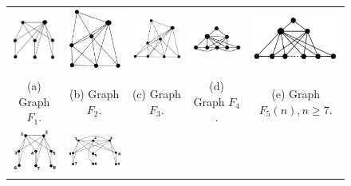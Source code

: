  \begin{figure}[htb]	
 
   \centering
  \begin{tabular}{  c c c c  c}
    \includegraphics[width=2.5cm]{img/f1.png} 
    & 
    \includegraphics[width=2.3cm]{img/f2.png} 
    & 
    \includegraphics[width=3cm]{img/f3.png} 
    & 
    \includegraphics[width=3cm]{img/f4.png} 
    & 
    \includegraphics[width=3cm]{img/f5.png} 
    \\
    \footnotesize 
    (a)  \footnotesize Graph $F_1$. 
    & 
    \footnotesize (b) Graph $F_2$.
    & 
    \footnotesize (c) Graph $F_3$.
    & 
    \footnotesize (d) Graph $F_4$.
    & 
    \footnotesize (e) Graph $F_5(n),n\geq7$.
    \\%
        \includegraphics[width=2.5cm]{img/f6.png} 
    & 
    \includegraphics[width=3.5cm]{img/f7.png} 

\end{tabular}
\end{figure}
